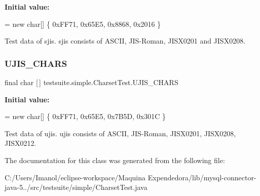 {\bfseries Initial value\+:}
\begin{DoxyCode}
= \textcolor{keyword}{new} \textcolor{keywordtype}{char}[] \{ 0xFF71, 
            0x65E5, 
            0x8868, 
            0x2016 
    \}
\end{DoxyCode}
Test data of sjis. sjis consists of A\+S\+C\+II, J\+I\+S-\/\+Roman, J\+I\+S\+X0201 and J\+I\+S\+X0208. \mbox{\label{classtestsuite_1_1simple_1_1_charset_test_afdb55a8c00071fb31c3b37c660d8ba3c}} 
\subsubsection{\texorpdfstring{U\+J\+I\+S\+\_\+\+C\+H\+A\+RS}{UJIS\_CHARS}}
{\footnotesize\ttfamily final char \mbox{[}$\,$\mbox{]} testsuite.\+simple.\+Charset\+Test.\+U\+J\+I\+S\+\_\+\+C\+H\+A\+RS\hspace{0.3cm}{\ttfamily [static]}}

{\bfseries Initial value\+:}
\begin{DoxyCode}
= \textcolor{keyword}{new} \textcolor{keywordtype}{char}[] \{ 0xFF71, 
            0x65E5, 
            0x7B5D, 
            0x301C 
    \}
\end{DoxyCode}
Test data of ujis. ujis consists of A\+S\+C\+II, J\+I\+S-\/\+Roman, J\+I\+S\+X0201, J\+I\+S\+X0208, J\+I\+S\+X0212. 

The documentation for this class was generated from the following file\+:\begin{DoxyCompactItemize}
\item 
C\+:/\+Users/\+Imanol/eclipse-\/workspace/\+Maquina Expendedora/lib/mysql-\/connector-\/java-\/5../src/testsuite/simple/Charset\+Test.\+java\end{DoxyCompactItemize}
